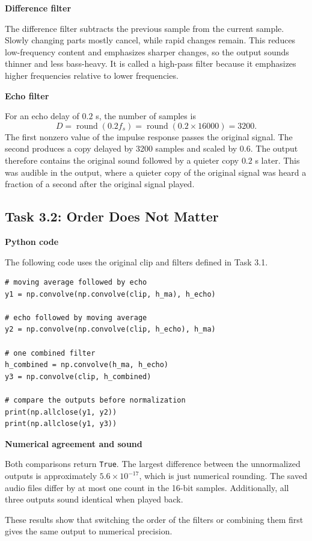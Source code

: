 \documentclass[11pt]{article}
\newcommand{\topic}[1]{\Needspace{4\baselineskip}\par\textbf{#1}\par\nopagebreak}
\begin{document}
\topic{Difference filter}

The difference filter subtracts the previous sample from the current sample. Slowly changing parts mostly cancel, while rapid changes remain. This reduces low-frequency content and emphasizes sharper changes, so the output sounds thinner and less bass-heavy. It is called a high-pass filter because it emphasizes higher frequencies relative to lower frequencies.

\topic{Echo filter}

For an echo delay of $0.2$ s, the number of samples is
\[
  D=\operatorname{round}(0.2f_s)=\operatorname{round}(0.2\times16000)=3200.
\]
The first nonzero value of the impulse response passes the original signal. The second produces a copy delayed by 3200 samples and scaled by $0.6$. The output therefore contains the original sound followed by a quieter copy $0.2$ s later. This was audible in the output, where a quieter copy of the original signal was heard a fraction of a second after the original signal played.

\subsection{Task 3.2: Order Does Not Matter}

\topic{Python code}

The following code uses the original clip and filters defined in Task 3.1.

\begin{lstlisting}[style=python]
# moving average followed by echo
y1 = np.convolve(np.convolve(clip, h_ma), h_echo)

# echo followed by moving average
y2 = np.convolve(np.convolve(clip, h_echo), h_ma)

# one combined filter
h_combined = np.convolve(h_ma, h_echo)
y3 = np.convolve(clip, h_combined)

# compare the outputs before normalization
print(np.allclose(y1, y2))
print(np.allclose(y1, y3))
\end{lstlisting}

\topic{Numerical agreement and sound}

Both comparisons return \texttt{True}. The largest difference between the unnormalized outputs is approximately $5.6\times10^{-17}$, which is just numerical rounding. The saved audio files differ by at most one count in the 16-bit samples. Additionally, all three outputs sound identical when played back.

These results show that switching the order of the filters or combining them first gives the same output to numerical precision.
\end{document}
